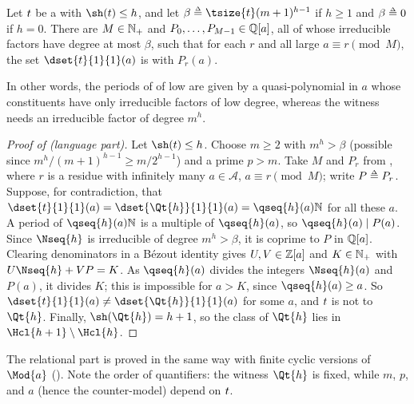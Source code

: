 \begin{proposition}\label{proposition: periods}
    Let $\term$ be a  with $\sh(\term) \le h$, and let $\beta \defeq \tsize{\term} (m + 1)^{h - 1}$ if $h \ge 1$ and $\beta \defeq 0$ if $h = 0$.
    There are $M \in \mathbb{N}_{+}$ and $P_0, \dots, P_{M-1} \in \mathbb{Q}[a]$, all of whose irreducible factors have degree at most $\beta$, such that for each $r$ and all large $a \equiv r \pmod M$, the set $\dset{\term}{1}{1}(a)$ is  with  $P_r(a)$.
\end{proposition}
In other words, the periods of  of low  are given by a quasi-polynomial in $a$ whose constituents have only irreducible factors of low degree, whereas the witness needs an irreducible factor of degree $m^{h}$.

\begin{proof}[Proof of  (language part)]
    Let $\sh(\term) \le h$.
    Choose $m \ge 2$ with $m^{h} > \beta$ (possible since $m^h / (m+1)^{h-1} \ge m / 2^{h-1}$) and a prime $p > m$.
    Take $M$ and $P_r$ from , where $r$ is a residue with infinitely many $a \in \mathcal{A}$, $a \equiv r \pmod M$; write $P \defeq P_r$.
    Suppose, for contradiction, that $\dset{\term}{1}{1}(a) = \dset{\Qt{h}}{1}{1}(a) = \qseq{h}(a) \nat$ for all these $a$.
    A period of $\qseq{h}(a) \nat$ is a multiple of $\qseq{h}(a)$, so $\qseq{h}(a) \mid P(a)$.
    Since $\Nseq{h}$ is irreducible of degree $m^h > \beta$, it is coprime to $P$ in $\mathbb{Q}[a]$.
    Clearing denominators in a B\'ezout identity gives $U, V \in \mathbb{Z}[a]$ and $K \in \mathbb{N}_{+}$ with $U \Nseq{h} + V P = K$.
    As $\qseq{h}(a)$ divides the integers $\Nseq{h}(a)$ and $P(a)$, it divides $K$; this is impossible for $a > K$, since $\qseq{h}(a) \ge a$.
    So $\dset{\term}{1}{1}(a) \ne \dset{\Qt{h}}{1}{1}(a)$ for some $a$, and $\term$ is not  to $\Qt{h}$.
    Finally, $\sh(\Qt{h}) = h + 1$, so the class of $\Qt{h}$ lies in $\Hcl{h+1} \setminus \Hcl{h}$.
\end{proof}

The relational part is proved in the same way with finite cyclic versions of $\Mod{a}$ ().
Note the order of quantifiers: the witness $\Qt{h}$ is fixed, while $m$, $p$, and $a$ (hence the counter-model) depend on $\term$.
